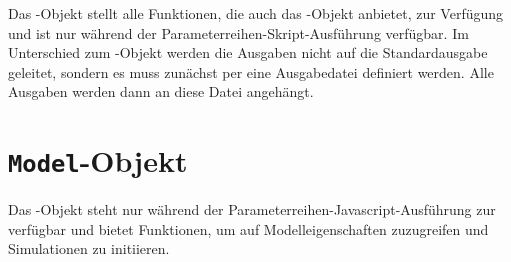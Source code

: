Das -Objekt stellt alle Funktionen, die auch das
-Objekt anbietet, zur Verfügung und ist nur während
der Parameterreihen-Skript-Ausführung verfügbar. Im Unterschied
zum -Objekt werden die Ausgaben nicht auf die Standardausgabe
geleitet, sondern es muss zunächst per 
eine Ausgabedatei definiert werden. Alle Ausgaben werden dann an diese
Datei angehängt.



\chapter{\texttt{Model}-Objekt}

Das -Objekt steht nur während der Parameterreihen-Javascript-Ausführung
zur verfügbar und bietet Funktionen, um auf Modelleigenschaften zuzugreifen und
Simulationen zu initiieren.

